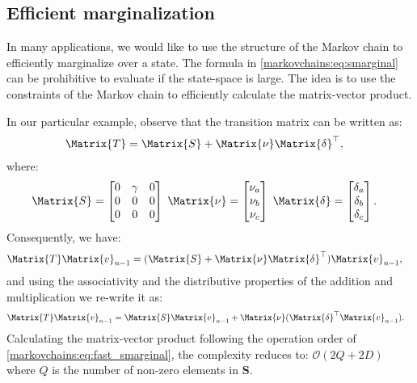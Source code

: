\documentclass[class=article, crop=false]{standalone}
\begin{document}
\subsection{Efficient marginalization}

In many applications, we would like to use the structure of the Markov
chain to efficiently marginalize over a state. The formula in
\eqref{markovchains:eq:smarginal} can be prohibitive to evaluate if the
state-space is large. The idea is to use the constraints of the Markov
chain to efficiently calculate the matrix-vector product.


In our particular example, observe that the transition matrix can be
written as:
\begin{align}
    \Matrix{T} &= \Matrix{S} + \Matrix{\nu} \Matrix{\delta}^\top,
\end{align}
where:
\begin{align}
    \Matrix{S} &= \begin{bmatrix}
        0 & \gamma & 0 \\
        0 & 0 & 0 \\
        0 & 0 & 0
    \end{bmatrix} \;
    \Matrix{\nu} = \begin{bmatrix} \nu_a \\ \nu_b \\ \nu_c \end{bmatrix}\;
    \Matrix{\delta} = \begin{bmatrix} \delta_a \\ \delta_b \\ \delta_c \end{bmatrix}.
\end{align}
Consequently, we have:
\begin{align}
    \Matrix{T} \Matrix{v}_{n-1} &= (\Matrix{S} +
        \Matrix{\nu} \Matrix{\delta}^\top) \Matrix{v}_{n-1},
\end{align}
and using the associativity and the distributive properties of the addition and
multiplication we re-write it as:
\begin{align}
    \Matrix{T} \Matrix{v}_{n-1} &= \Matrix{S} \Matrix{v}_{n-1} +
        \Matrix{\nu} (\Matrix{\delta}^\top \Matrix{v}_{n-1}) \label{markovchains:eq:fast_smarginal}.
\end{align}
Calculating the matrix-vector product following the operation order of
\eqref{markovchains:eq:fast_smarginal}, the complexity reduces to:
$\mathcal{O}(2Q + 2D)$ where $Q$ is the number of non-zero elements in
$\mathbf{S}$.
\end{document}
